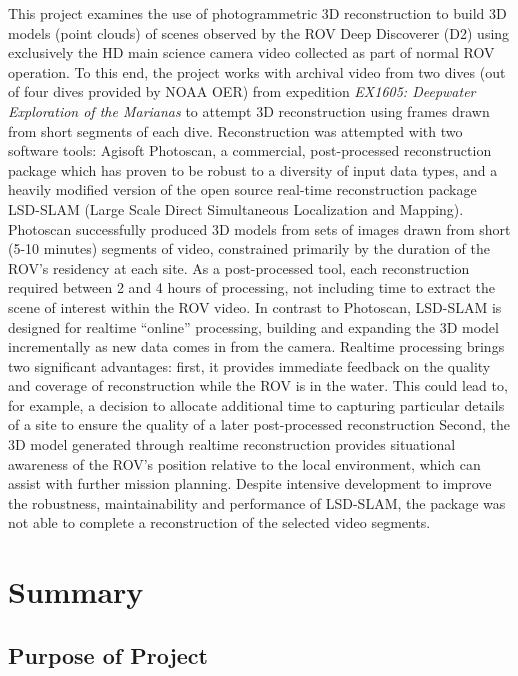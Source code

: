 \documentclass[letterpaper,12pt]{article}
\begin{document}
This project examines the use of photogrammetric 3D reconstruction to build 3D models (point clouds) of scenes observed by the ROV Deep Discoverer (D2) using exclusively the HD main science camera video collected as part of normal ROV operation.   To this end, the project works with archival video from two dives (out of four dives provided by NOAA OER) from expedition \textit{EX1605: Deepwater Exploration of the Marianas} to attempt 3D reconstruction using frames drawn from short segments of each dive.   Reconstruction was attempted with two software tools: Agisoft Photoscan, a commercial, post-processed reconstruction package which has proven to be robust to a diversity of input data types, and a heavily modified version of the open source real-time reconstruction package LSD-SLAM (Large Scale Direct Simultaneous Localization and Mapping).   Photoscan successfully produced 3D models from sets of images drawn from short (5-10 minutes) segments of video, constrained primarily by the duration of the ROV's residency at each site.    As a post-processed tool, each reconstruction required between 2 and 4 hours of processing, not including time to extract the scene of interest within the ROV video.  In contrast to Photoscan, LSD-SLAM is designed for realtime ``online'' processing, building and expanding the 3D model incrementally as new data comes in from the camera.    Realtime processing brings two significant advantages:   first, it provides immediate feedback on the quality and coverage of reconstruction while the ROV is in the water.   This could lead to, for example, a decision to allocate additional time to capturing particular details of a site to ensure the quality of a later post-processed reconstruction   Second, the 3D model generated through realtime reconstruction provides situational awareness of the ROV's position relative to the local environment, which can assist with further mission planning.    Despite intensive development to improve the robustness, maintainability and performance of LSD-SLAM, the package was not able to complete a reconstruction of the selected video segments. 

\section{Summary}

\subsection{Purpose of Project}
\end{document}
